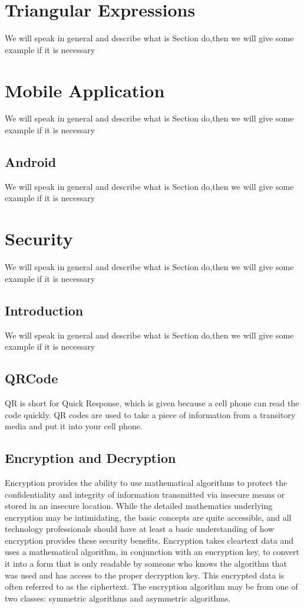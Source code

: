 \section{Triangular Expressions}
We will speak in general and describe what is Section do,then we will give some example if it is necessary

\section{Mobile Application}
We will speak in general and describe what is Section do,then we will give some example if it is necessary

\subsection{Android}
We will speak in general and describe what is Section do,then we will give some example if it is necessary



\section{Security}
We will speak in general and describe what is Section do,then we will give some example if it is necessary

\subsection{Introduction}
We will speak in general and describe what is Section do,then we will give some example if it is necessary

\subsection{QRCode}
QR is short for Quick Response, which is given because
a cell phone can read the code quickly. QR codes are used
to take a piece of information from a transitory media and
put it into your cell phone.

\subsection{Encryption and Decryption}
Encryption provides the ability to use mathematical
algorithms to protect the confidentiality and integrity of
information transmitted via insecure means or stored in an
insecure location. While the detailed mathematics underlying
encryption may be intimidating, the basic concepts are quite
accessible, and all technology professionals should have at
least a basic understanding of how encryption provides these
security benefits.
Encryption takes cleartext data and uses a mathematical
algorithm, in conjunction with an encryption key, to convert
it into a form that is only readable by someone who knows
the algorithm that was used and has access to the proper
decryption key. This encrypted data is often referred to
as the ciphertext. The encryption algorithm may be from
one of two classes: symmetric algorithms and asymmetric
algorithms.



